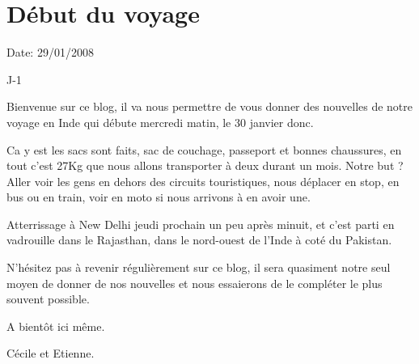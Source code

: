 \section{Début du voyage}

Date: 29/01/2008

\begin{multicols}{2}

J-1

Bienvenue sur ce blog, il va nous permettre de vous donner des nouvelles de notre voyage en Inde qui débute mercredi matin, le 30 janvier donc.

Ca y est les sacs sont faits, sac de couchage, passeport et bonnes chaussures, en tout c'est 27Kg que nous allons transporter à deux durant un mois. Notre but ? Aller voir les gens en dehors des circuits touristiques, nous déplacer en stop, en bus ou en train, voir en moto si nous arrivons à en avoir une.

Atterrissage à New Delhi jeudi prochain un peu après minuit, et c'est parti en vadrouille dans le Rajasthan, dans le nord-ouest de l'Inde à coté du Pakistan.

N'hésitez pas à revenir régulièrement sur ce blog, il sera quasiment notre seul moyen de donner de nos nouvelles et nous essaierons de le compléter le plus souvent possible.

A bientôt ici même.

Cécile et Etienne.

\end{multicols}
